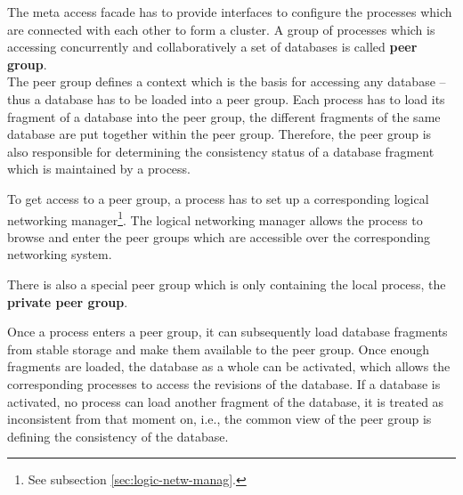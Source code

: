 \documentclass[a4paper, 10pt]{book}
\begin{document}
                                The meta access facade has to provide interfaces to configure the
                                processes which are connected with each other to form a cluster. A
                                group of processes which is accessing concurrently and
                                collaboratively a set of databases is called \textbf{peer group}.\\
                                The peer group defines a context which is the basis for accessing any
                                database -- thus a database has to be loaded into a peer group. Each
                                process has to load its fragment of a database into the peer group,
                                the different fragments of the same database are put together within
                                the peer group. Therefore, the peer group is also responsible for
                                determining the consistency status of a database fragment which is
                                maintained by a process.

                                To get access to a peer group, a process has to set up a corresponding
                                logical networking manager\footnote{See subsection
                                \vref{sec:logic-netw-manag}.}. The logical networking manager allows
                                the process to browse and enter the peer groups which are accessible
                                over the corresponding networking system.

                                There is also a special peer group which is only containing the local
                                process, the \textbf{private peer group}. 

                                Once a process enters a peer group, it can subsequently load
                                database fragments from stable storage and make them available to the
                                peer group. Once enough fragments are loaded, the database as a whole
                                can be activated, which allows the corresponding processes to access
                                the revisions of the database. If a database is activated, no process
                                can load another fragment of the database, it is treated as
                                inconsistent from that moment on, i.e., the common view of the peer
                                group is defining the consistency of the database. 
\end{document}
